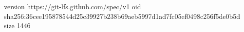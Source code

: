 version https://git-lfs.github.com/spec/v1
oid sha256:36cee195878544d25c39927b238b69aeb5997d1ad7fc05ef0498c256f5de0b5d
size 1446
